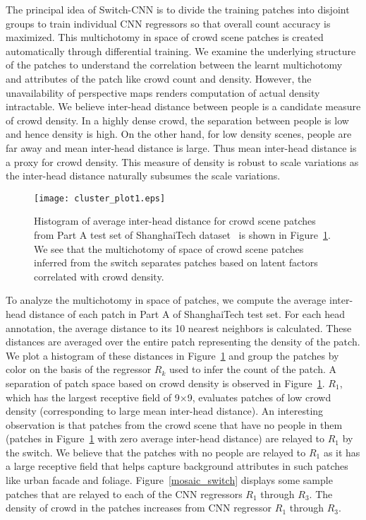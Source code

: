\documentclass[10pt,twocolumn,letterpaper]{article}
\begin{document}
The principal idea of Switch-CNN is to divide the training patches into disjoint groups to train individual CNN regressors so that overall count accuracy is maximized.
This multichotomy in space of crowd scene patches is created automatically through differential training.
We examine the underlying structure of the patches to understand the correlation between the learnt multichotomy and attributes of the patch like crowd count and density. However, the unavailability of perspective maps renders computation of actual density intractable. We believe inter-head distance between people is a candidate measure of crowd density. In a highly dense crowd, the separation between people is
low and hence density is high. On the other hand, for low density
scenes, people are far away and mean inter-head distance is large.
Thus mean inter-head distance is a proxy for crowd density. This measure of density is robust to scale variations as the inter-head distance naturally subsumes the scale variations. 

\begin{figure}[!h]
 \texttt{[image: cluster\_plot1.eps]}\hspace{0.3cm}%
 \caption{Histogram of average inter-head distance for crowd scene patches from Part A test set of ShanghaiTech dataset~\cite{zhang2016single} is shown in Figure~\ref{cluster_plot}. We see that the multichotomy of space of crowd scene patches inferred from the switch separates patches based on latent factors correlated with crowd density.}
\label{cluster_plot}
\end{figure}

To analyze the multichotomy in space of patches, we compute the average inter-head distance of each patch in Part A of ShanghaiTech test set. For each head annotation, the average distance to its 10 nearest neighbors is calculated.
These distances are averaged over the entire patch representing the density of the patch. We plot a histogram of these distances in Figure~\ref{cluster_plot} and group the patches by color on the basis of the regressor $R_k$ used to infer the count of the patch. A separation of patch space based on crowd density is observed in Figure~\ref{cluster_plot}. $R_1$, which has the largest receptive
field of 9$\times$9, evaluates patches of low crowd density (corresponding to large mean inter-head distance).  An interesting observation is that patches from the crowd scene that have no people in them (patches in Figure~\ref{cluster_plot} with zero average inter-head distance) are relayed to $R_1$ by the switch. We believe that the patches with no people are relayed to $R_1$ as it has a large receptive field that helps capture background attributes in such patches like urban facade and foliage. Figure~\ref{mosaic_switch} displays some sample patches that are relayed to each of the CNN regressors $R_1$ through $R_3$. The density of crowd in the patches increases from CNN regressor $R_1$ through $R_3$.
\end{document}
